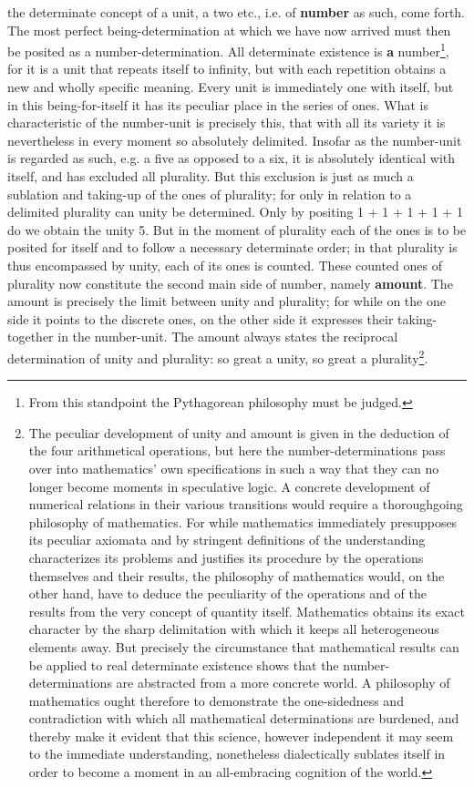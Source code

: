 \documentclass[12pt,a4paper,openany]{book}
\newcommand{\opage}[1]{\marginnote{\footnotesize\textit{[#1]}}}
\begin{document}
the determinate concept of a unit, a two etc.,
i.e. of \textbf{number} as such, come forth. The most perfect
being-determination at which we have now arrived must then
be posited as a number-determination. All determinate existence is \textbf{a}
number\footnote{From this standpoint the Pythagorean philosophy must be judged.}, for it is a unit that repeats itself
to infinity, but with each repetition obtains a
new and wholly specific meaning. Every unit is
immediately one with itself, but in this being-for-itself
it has its peculiar place in the series of ones. What is characteristic of the number-unit is precisely this, that
with all its variety it is nevertheless in every moment so absolutely
delimited. Insofar as the number-unit is regarded as
such, e.g. a five as opposed to a six, it is absolutely
identical with itself, and has excluded all plurality.
But this exclusion is just as much a sublation
and taking-up of the ones of plurality; for only in
relation to a delimited plurality can unity be determined.
Only by positing 1 + 1 + 1 + 1 + 1 do we obtain
the unity 5. But in the moment of plurality each
of the ones is to be posited for itself and to follow a necessary determinate
order; in that plurality is thus encompassed
by unity, each of its ones is counted.
These counted ones of plurality now constitute the second
main side of number, namely \textbf{amount}. The amount is precisely
the limit between unity and plurality; for while
on the one side it points to the discrete ones,
on the other side it expresses their
\setcounter{footnote}{0}%
\opage{34}taking-together in the number-unit. The amount always states the reciprocal
determination of unity and plurality: so great
a unity, so great a plurality\footnote{The peculiar development of unity and amount is given in the deduction of the four arithmetical operations, but here the number-determinations pass over into mathematics' own specifications in such a way that they can no longer become moments in speculative logic. A concrete development of numerical relations in their various transitions would require a thoroughgoing philosophy of mathematics. For while mathematics immediately presupposes its peculiar axiomata and by stringent definitions of the understanding characterizes its problems and justifies its procedure by the operations themselves and their results, the philosophy of mathematics would, on the other hand, have to deduce the peculiarity of the operations and of the results from the very concept of quantity itself. Mathematics obtains its exact character by the sharp delimitation with which it keeps all heterogeneous elements away. But precisely the circumstance that mathematical results can be applied to real determinate existence shows that the number-determinations are abstracted from a more concrete world. A philosophy of mathematics ought therefore to demonstrate the one-sidedness and contradiction with which all mathematical determinations are burdened, and thereby make it evident that this science, however independent it may seem to the immediate understanding, nonetheless dialectically sublates itself in order to become a moment in an all-embracing cognition of the world.}.
\end{document}
